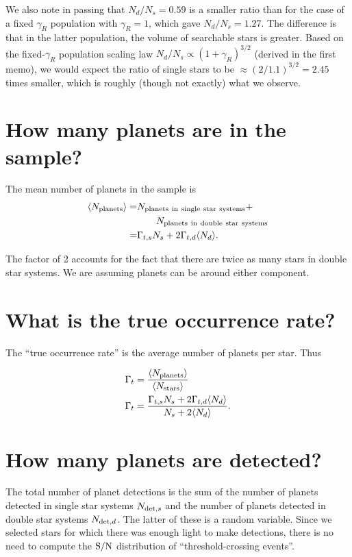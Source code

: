 \documentclass{emulateapj}
\begin{document}
We also note in passing that $N_d/N_s = 0.59$ is a smaller ratio than for the 
case of a fixed $\gamma_R$ population with $\gamma_R = 1$, which gave $N_d/N_s 
= 1.27$. The difference is that in the latter population, the volume of 
searchable stars is greater. Based on the fixed-$\gamma_R$ population scaling 
law $N_d / N_s \propto (1+\gamma_R)^{3/2}$ (derived in the first memo), we 
would expect the ratio of single stars to be $\approx (2/1.1)^{3/2} = 2.45$ 
times smaller, which is roughly (though not exactly) what we observe.


\section{How many planets are in the sample?}

The mean number of planets in the sample is
\begin{align}
\langle N_{\rm planets} \rangle
			   =& N_{\rm planets\ in\ single\ star\ systems}  +  \\
				  &\quad\quad N_{\rm planets\ in\ double\ star\ systems} 
				  \nonumber \\
			   =& \Gamma_{t,s} N_s + 2 \Gamma_{t,d} \langle N_d \rangle.
\end{align}

The factor of 2 accounts for the fact that there are twice as many stars in 
double star systems. We are assuming planets can be around either 
component.


\section{What is the true occurrence rate?}
\label{sec:true_rate}

The ``true occurrence rate'' is the average number of planets per star. Thus

\begin{align}
\Gamma_t &= \frac{\langle N_{\rm planets}\rangle}{\langle N_{\rm stars} \rangle} \\
\Gamma_t &= \frac{\Gamma_{t,s} N_s + 2 \Gamma_{t,d} \langle N_d\rangle}{N_s +
2\langle N_d\rangle}.
\label{eq:true_occ}
\end{align}


\section{How many planets are detected?}
The total number of planet detections is the sum of the number of planets 
detected in single star systems $N_{{\rm det},s}$ and the number of planets 
detected in double star systems $N_{{\rm det},d}$.
The latter of these is a random variable.
Since we selected stars for which there was enough light to make detections, 
there is no need to compute the ${\rm S/N}$ distribution of 
``threshold-crossing events''.
\end{document}
